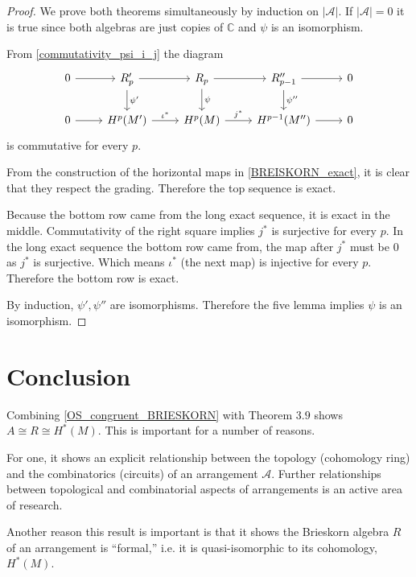 \documentclass[article,twoside]{article}
\newcommand{\CC}{\mathbb{C}}
\newcommand{\script}[1]{\mathcal{#1}}
\theoremstyle{plain}
\theoremstyle{plain}
\theoremstyle{plain}
\theoremstyle{plain}
\theoremstyle{plain}
\theoremstyle{definition}
\theoremstyle{definition}
\theoremstyle{definition}
\theoremstyle{remark}
\theoremstyle{remark}
\begin{document}
\begin{proof}\label{BRIESKORN_cong_COHOM}
	We prove both theorems simultaneously by induction on $|\script{A}|$. If $|\script{A}|=0$ it is true since both algebras are just copies of $\CC$ and $\psi$ is an isomorphism.
	
	From \autoref{commutativity_psi_i_j} the diagram
	$$
	\begin{tikzcd}
	0\rar & R_p'\rar\dar{\psi'} & R_p\rar\dar{\psi} & R_{p-1}''\rar\dar{\psi''} & 0
	\\
	0\rar & H^p(M')\rar{\iota^*} & H^p(M)\rar{j^*} & H^{p-1}(M'')\rar & 0
	\end{tikzcd}
	$$
	is commutative for every $p$.
	
	From the construction of the horizontal maps in \autoref{BREISKORN_exact}, it is clear that they respect the grading. Therefore the top sequence is exact.
	
	Because the bottom row came from the long exact sequence, it is exact in the middle. Commutativity of the right square implies $j^*$ is surjective for every $p$. In the long exact sequence the bottom row came from, the map after $j^*$ must be $0$ as $j^*$ is surjective. Which means $\iota^*$ (the next map) is injective for every $p$. Therefore the bottom row is exact.
	
	By induction, $\psi',\psi''$ are isomorphisms. Therefore the five lemma implies $\psi$ is an isomorphism.
\end{proof}




\section{Conclusion}

Combining \autoref{OS_congruent_BRIESKORN} with Theorem $3.9$ shows $A\cong R\cong H^*(M)$. This is important for a number of reasons.


For one, it shows an explicit relationship between the topology (cohomology ring) and the combinatorics (circuits) of an arrangement $\script{A}$. Further relationships between topological and combinatorial aspects of arrangements is an active area of research.

Another reason this result is important is that it shows the Brieskorn algebra $R$ of an arrangement is ``formal,'' i.e. it is quasi-isomorphic to its cohomology, $H^*(M)$.
\end{document}

